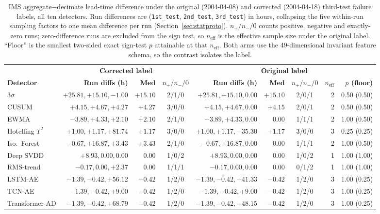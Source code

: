 \documentclass[IJPHM, 2026, 0]{PHMSociety}
\begin{document}
\begin{table}[t] \footnotesize
	\begin{center}
	\caption{IMS aggregate$-$decimate lead-time difference under the original (2004-04-08) and corrected (2004-04-18) third-test failure labels, all ten detectors. Run differences are (\texttt{1st\_test}, \texttt{2nd\_test}, \texttt{3rd\_test}) in hours, collapsing the five within-run sampling factors to one mean difference per run (Section~\ref{sec:statproto}). $n_+/n_-/0$ counts positive, negative and exactly-zero runs; zero-difference runs are excluded from the sign test, so $n_{\text{eff}}$ is the effective sample size under the original label. ``Floor'' is the smallest two-sided exact sign-test $p$ attainable at that $n_{\text{eff}}$. Both arms use the 49-dimensional invariant feature schema, so the contrast isolates the label.}
	\label{tab:d17label}
	\begin{tabular}{l r r c r r c r r}
		\hline \hline
		 & \multicolumn{3}{c}{\textbf{Corrected label}} & \multicolumn{5}{c}{\textbf{Original label}} \\
		\textbf{Detector} & \textbf{Run diffs (h)} & \textbf{Med} & \textbf{$n_+/n_-/0$} & \textbf{Run diffs (h)} & \textbf{Med} & \textbf{$n_+/n_-/0$} & \textbf{$n_{\text{eff}}$} & \textbf{$p$ (floor)} \\
		\hline
		$3\sigma$ & $+25.81, +15.10, -1.00$ & $+15.10$ & 2/1/0 & $+25.81, +15.10, 0.00$ & $+15.10$ & 2/0/1 & 2 & 0.50 (0.50) \\
		CUSUM & $+4.15, +4.67, +4.27$ & $+4.27$ & 3/0/0 & $+4.15, +4.67, 0.00$ & $+4.15$ & 2/0/1 & 2 & 0.50 (0.50) \\
		EWMA & $-3.89, +4.33, +2.10$ & $+2.10$ & 2/1/0 & $-3.89, +4.33, 0.00$ & $0.00$ & 1/1/1 & 2 & 1.00 (0.50) \\
		Hotelling $T^2$ & $+1.00, +1.17, +81.74$ & $+1.17$ & 3/0/0 & $+1.00, +1.17, +35.30$ & $+1.17$ & 3/0/0 & 3 & 0.25 (0.25) \\
		Iso.\ Forest & $-0.67, +16.87, +3.43$ & $+3.43$ & 2/1/0 & $-0.67, +16.87, 0.00$ & $0.00$ & 1/1/1 & 2 & 1.00 (0.50) \\
		Deep SVDD & $+8.93, 0.00, 0.00$ & $0.00$ & 1/0/2 & $+8.93, 0.00, 0.00$ & $0.00$ & 1/0/2 & 1 & 1.00 (1.00) \\
		RMS-trend & $-0.17, 0.00, +2.37$ & $0.00$ & 1/1/1 & $-0.17, 0.00, 0.00$ & $0.00$ & 0/1/2 & 1 & 1.00 (1.00) \\
		LSTM-AE & $-1.39, -0.42, +56.12$ & $-0.42$ & 1/2/0 & $-1.39, -0.42, +41.33$ & $-0.42$ & 1/2/0 & 3 & 1.00 (0.25) \\
		TCN-AE & $-1.39, -0.42, +9.00$ & $-0.42$ & 1/2/0 & $-1.39, -0.42, +9.00$ & $-0.42$ & 1/2/0 & 3 & 1.00 (0.25) \\
		Transformer-AD & $-1.39, -0.42, +68.79$ & $-0.42$ & 1/2/0 & $-1.39, -0.42, +48.15$ & $-0.42$ & 1/2/0 & 3 & 1.00 (0.25) \\
		\hline \hline
	\end{tabular}
	\end{center}
\end{table}
\end{document}

